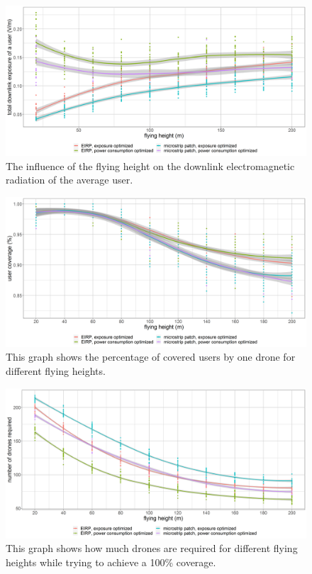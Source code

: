 \begin{figure}[h!]
  \includegraphics[width=\textwidth]{../results/s3/fhvsdl.png}
  \caption{The influence of the flying height on the downlink electromagnetic radiation of the average user.}
  \label{fig:s3fhvsdl}
\end{figure}

\begin{figure}[]
  \includegraphics[width=\textwidth]{../results/s3/fhvscov.png}
  \caption{This graph shows the percentage of covered users by one drone for different flying heights.}
  \label{fig:s3fhvscov}
\end{figure}

\begin{figure}[]
  \includegraphics[width=\textwidth]{../results/s3/fhvsnumdrones.png}
  \caption{This graph shows how much drones are required for different flying heights while trying to achieve a 100\% coverage.}
  \label{fig:s3fhvscov}
\end{figure}

